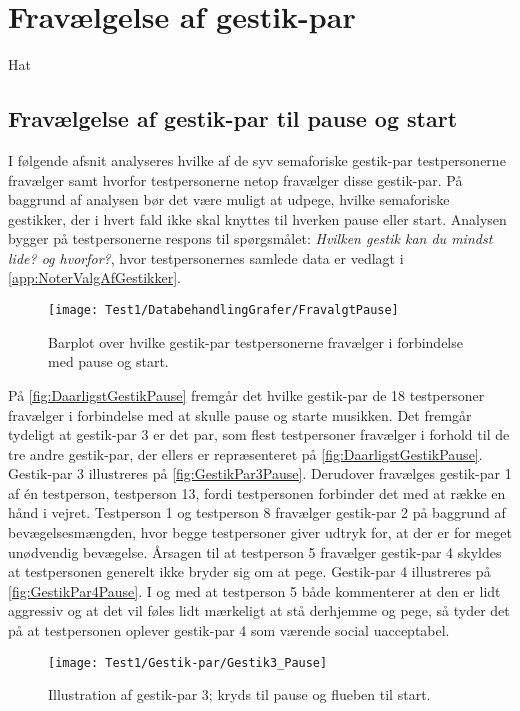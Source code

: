 \chapter{Fravælgelse af gestik-par}
\label{app:TestresultaterFravaelgelse}
%
Hat
%
\section{Fravælgelse af gestik-par til pause og start}
\label{app:TestresultaterPauseDaarlig} 
%
I følgende afsnit analyseres hvilke af de syv semaforiske gestik-par testpersonerne fravælger samt hvorfor testpersonerne netop fravælger disse gestik-par. På baggrund af analysen bør det være muligt at udpege, hvilke semaforiske gestikker, der i hvert fald ikke skal knyttes til hverken pause eller start. Analysen bygger på testpersonerne respons til spørgsmålet: \textit{Hvilken gestik kan du mindst lide? og hvorfor?}, hvor testpersonernes samlede data er vedlagt i \autoref{app:NoterValgAfGestikker}.
%
\begin{figure}[H]
	\centering
	\texttt{[image: Test1/DatabehandlingGrafer/FravalgtPause]}
	\caption{Barplot over hvilke gestik-par testpersonerne fravælger i forbindelse med pause og start.}
	\label{fig:DaarligstGestikPause}
\end{figure}
\noindent
% 
På \autoref{fig:DaarligstGestikPause} fremgår det hvilke gestik-par de 18 testpersoner fravælger i forbindelse med at skulle pause og starte musikken. Det fremgår tydeligt at gestik-par 3 er det par, som flest testpersoner fravælger i forhold til de tre andre gestik-par, der ellers er repræsenteret på \autoref{fig:DaarligstGestikPause}. Gestik-par 3 illustreres på \autoref{fig:GestikPar3Pause}. Derudover fravælges gestik-par 1 af én testperson, testperson 13, fordi testpersonen forbinder det med at række en hånd i vejret. Testperson 1 og testperson 8 fravælger gestik-par 2 på baggrund af bevægelsesmængden, hvor begge testpersoner giver udtryk for, at der er for meget unødvendig bevægelse. Årsagen til at testperson 5 fravælger gestik-par 4 skyldes at testpersonen generelt ikke bryder sig om at pege. Gestik-par 4 illustreres på \autoref{fig:GestikPar4Pause}. I og med at testperson 5 både kommenterer at den er lidt aggressiv og at det vil føles lidt mærkeligt at stå derhjemme og pege, så tyder det på at testpersonen oplever gestik-par 4 som værende social uacceptabel. 
%
\begin{figure}[H]
	\centering
	\texttt{[image: Test1/Gestik-par/Gestik3\_Pause]}
	\caption{Illustration af gestik-par 3; kryds til pause og flueben til start.}
	\label{fig:GestikPar3Pause}
\end{figure}

